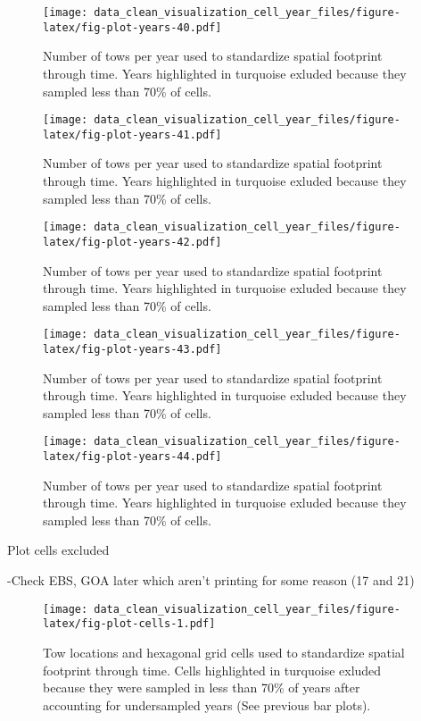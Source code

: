 \documentclass[
]{article}
\begin{document}
\begin{figure}
\centering
\texttt{[image: data\_clean\_visualization\_cell\_year\_files/figure-latex/fig-plot-years-40.pdf]}
\caption{\label{fig:fig-plot-years-40}Number of tows per year used to standardize spatial footprint through time. Years highlighted in turquoise exluded because they sampled less than 70\% of cells.}
\end{figure}

\begin{figure}
\centering
\texttt{[image: data\_clean\_visualization\_cell\_year\_files/figure-latex/fig-plot-years-41.pdf]}
\caption{\label{fig:fig-plot-years-41}Number of tows per year used to standardize spatial footprint through time. Years highlighted in turquoise exluded because they sampled less than 70\% of cells.}
\end{figure}

\begin{figure}
\centering
\texttt{[image: data\_clean\_visualization\_cell\_year\_files/figure-latex/fig-plot-years-42.pdf]}
\caption{\label{fig:fig-plot-years-42}Number of tows per year used to standardize spatial footprint through time. Years highlighted in turquoise exluded because they sampled less than 70\% of cells.}
\end{figure}

\begin{figure}
\centering
\texttt{[image: data\_clean\_visualization\_cell\_year\_files/figure-latex/fig-plot-years-43.pdf]}
\caption{\label{fig:fig-plot-years-43}Number of tows per year used to standardize spatial footprint through time. Years highlighted in turquoise exluded because they sampled less than 70\% of cells.}
\end{figure}

\begin{figure}
\centering
\texttt{[image: data\_clean\_visualization\_cell\_year\_files/figure-latex/fig-plot-years-44.pdf]}
\caption{\label{fig:fig-plot-years-44}Number of tows per year used to standardize spatial footprint through time. Years highlighted in turquoise exluded because they sampled less than 70\% of cells.}
\end{figure}

Plot cells excluded

-Check EBS, GOA later which aren't printing for some reason (17 and 21)

\begin{figure}
\centering
\texttt{[image: data\_clean\_visualization\_cell\_year\_files/figure-latex/fig-plot-cells-1.pdf]}
\caption{\label{fig:fig-plot-cells-1}Tow locations and hexagonal grid cells used to standardize spatial footprint through time. Cells highlighted in turquoise exluded because they were sampled in less than 70\% of years after accounting for undersampled years (See previous bar plots).}
\end{figure}
\end{document}
